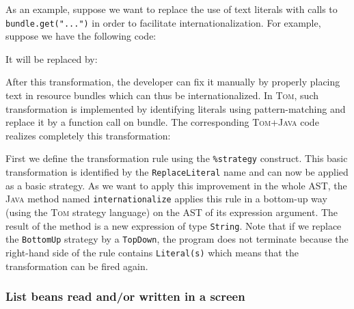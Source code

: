 \documentclass[runningheads]{llncs}
\newcommand{\tom}{\textsc{Tom}}
\newcommand{\java}{\textsc{Java}}
\begin{document}
As an example, suppose we want to replace the use of text literals with calls
to \verb+bundle.get("...")+ in order to facilitate internationalization. For
example, suppose we have the following code:


It will be replaced by:

\begin{el}
${cars.getRowCount()} ${bundle.get("Cars' total price"}} =
  $ ${cars.getTotalPrice()}
\end{el}

After this transformation, the developer can fix it manually by properly
placing text in resource bundles which can thus be internationalized.
In {\tom}, such transformation is implemented by identifying literals using
pattern-matching and replace it by a function call on bundle. The corresponding
{\tom}+{\java} code realizes completely this transformation:


First we define the transformation rule using the \verb+%strategy+ construct.
This basic transformation is identified by the \texttt{ReplaceLiteral} name and
can now be applied as a basic strategy. As we want to apply this improvement in
the whole AST, the {\java} method named \texttt{internationalize} applies this
rule in a bottom-up way (using the {\tom} strategy language) on the AST of its
expression argument. The result of the method is a new expression of type
\texttt{String}. Note that if we replace the \verb+BottomUp+ strategy by a
\verb+TopDown+, the program does not terminate because the right-hand side of
the rule contains \verb+Literal(s)+ which means that the transformation can be
fired again.

\subsubsection{List beans read and/or written in a screen}
\end{document}
